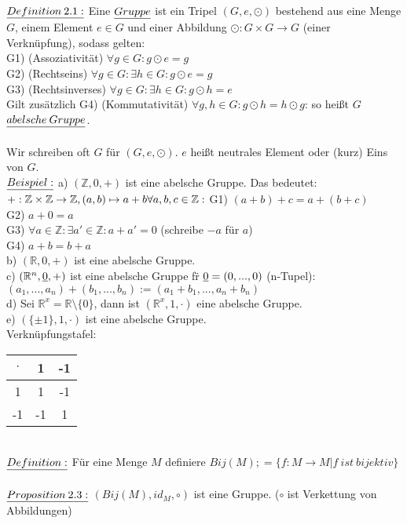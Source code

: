 \documentclass[fleqn, a4paper, 11pt]{article}
\begin{document}
$\uline{Definition\:2.1:}$ Eine $\uline{Gruppe}$ ist ein Tripel $(G,e,\odot)$ bestehend aus eine Menge $G$, einem Element $e\in G$ und einer Abbildung $\odot:G\times G\rightarrow G$ (einer Verkn\"upfung), sodass gelten:\\
G1) (Assoziativit\"at) $\forall g\in G:g\odot e=g$\\
G2) (Rechtseins) $\forall g\in G:\exists h\in G:g\odot e=g$\\
G3) (Rechtsinverses) $\forall g\in G:\exists h\in G:g\odot h=e$\\
Gilt zus\"atzlich G4) (Kommutativit\"at) $\forall g,h\in G:g\odot h=h\odot g$: so hei\ss{}t $G$ $\uline{abelsche\:Gruppe}$.\\
\\
Wir schreiben oft $G$ f\"ur $(G,e,\odot)$. $e$ hei\ss{}t neutrales Element oder (kurz) Eins von $G$.\\
$\uline{Beispiel:}$ a) $(\mathbb{Z},0,+)$ ist eine abelsche Gruppe. Das bedeutet: $+:\mathbb{Z}\times\mathbb{Z}\rightarrow\mathbb{Z},(a,b)\mapsto a+b\\
\forall a,b,c\in\mathbb{Z}:$ G1) $(a+b)+c=a+(b+c)$\\
G2) $a+0=a$\\
G3) $\forall a\in\mathbb{Z}:\exists a'\in\mathbb{Z}: a+a'=0$ (schreibe $-a$ f\"ur $a$)\\
G4) $a+b=b+a$\\
b) $(\mathbb{R},0,+)$ ist eine abelsche Gruppe.\\
c) $(\mathbb{R}^{n},\uline{0},+)$ ist eine abelsche Gruppe f\"r $\uline{0}=(0,...,0)$ (n-Tupel): $(a_{1},...,a_{n})+(b_{1},...,b_{n}):=(a_{1}+b_{1},...,a_{n}+b_{n})$\\
d) Sei $\mathbb{R}^{x}=\mathbb{R}\setminus\{0\}$, dann ist $(\mathbb{R}^{x},1,\cdot)$ eine abelsche Gruppe.\\
e) $(\{\pm 1\},1,\cdot)$ ist eine abelsche Gruppe.\\
Verkn\"upfungstafel:
\begin{tabular}{|c|cc|}
	\hline
	$\cdot$ & 1 & -1\\
	\hline
	1 & 1 & -1\\
	-1 & -1 & 1\\
	\hline
\end{tabular}
\\
$\uline{Definition:}$ F\"ur eine Menge $M$ definiere $Bij(M);=\{f:M\rightarrow M|f\:ist\:bijektiv\}$\\
\\
$\uline{Proposition\:2.3:}$ $(Bij(M),id_{M},\circ)$ ist eine Gruppe. ($\circ$ ist Verkettung von Abbildungen)\\
\end{document}
